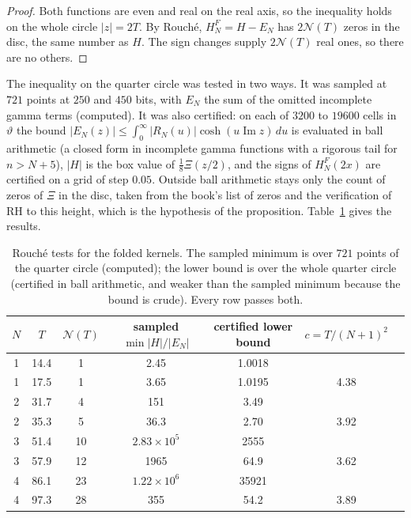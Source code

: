 \begin{proof}
Both functions are even and real on the real axis, so the inequality holds on the whole circle $|z|=2T$. By Rouch\'e, $H^F_N=H-E_N$ has $2\mathcal N(T)$ zeros in the disc, the same number as $H$. The sign changes supply $2\mathcal N(T)$ real ones, so there are no others.
\end{proof}

The inequality on the quarter circle was tested in two ways. It was sampled at $721$ points at $250$ and $450$ bits, with $E_N$ the sum of the omitted incomplete gamma terms (computed). It was also certified: on each of $3200$ to $19600$ cells in $\vartheta$ the bound $|E_N(z)|\le\int_0^\infty|R_N(u)|\cosh(u\operatorname{Im}z)\,du$ is evaluated in ball arithmetic (a closed form in incomplete gamma functions with a rigorous tail for $n>N+5$), $|H|$ is the box value of $\tfrac18\Xi(z/2)$, and the signs of $H^F_N(2x)$ are certified on a grid of step $0.05$. Outside ball arithmetic stays only the count of zeros of $\Xi$ in the disc, taken from the book's list of zeros and the verification of RH to this height, which is the hypothesis of the proposition. Table~\ref{ev:tab:rouche} gives the results.

\begin{table}[h]\centering\small
\begin{tabular}{ccccccc}
\toprule
$N$ & $T$ & $\mathcal N(T)$ & sampled $\min|H|/|E_N|$ & certified lower bound & $c=T/(N+1)^2$\\
\midrule
1 & 14.4 & 1 & 2.45 & 1.0018 & \\
1 & 17.5 & 1 & 3.65 & 1.0195 & 4.38\\
2 & 31.7 & 4 & 151 & 3.49 & \\
2 & 35.3 & 5 & 36.3 & 2.70 & 3.92\\
3 & 51.4 & 10 & $2.83\times10^5$ & 2555 & \\
3 & 57.9 & 12 & 1965 & 64.9 & 3.62\\
4 & 86.1 & 23 & $1.22\times10^6$ & 35921 & \\
4 & 97.3 & 28 & 355 & 54.2 & 3.89\\
\bottomrule
\end{tabular}
\caption{Rouch\'e tests for the folded kernels. The sampled minimum is over $721$ points of the quarter circle (computed); the lower bound is over the whole quarter circle (certified in ball arithmetic, and weaker than the sampled minimum because the bound is crude). Every row passes both.}\label{ev:tab:rouche}
\end{table}

